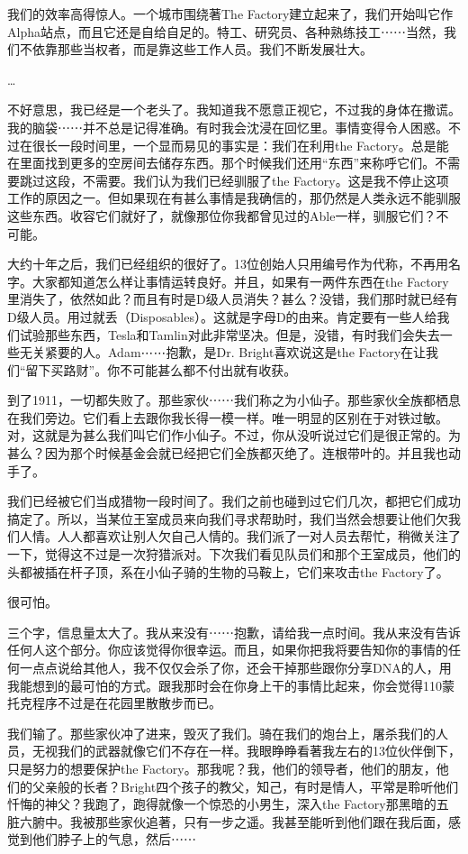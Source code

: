 我们的效率高得惊人。一个城市围绕著The Factory建立起来了，我们开始叫它作Alpha站点，而且它还是自给自足的。特工、研究员、各种熟练技工⋯⋯当然，我们不依靠那些当权者，而是靠这些工作人员。我们不断发展壮大。

…

不好意思，我已经是一个老头了。我知道我不愿意正视它，不过我的身体在撒谎。我的脑袋⋯⋯并不总是记得准确。有时我会沈浸在回忆里。事情变得令人困惑。不过在很长一段时间里，一个显而易见的事实是：我们在利用the Factory。总是能在里面找到更多的空房间去储存东西。那个时候我们还用“东西”来称呼它们。不需要跳过这段，不需要。我们认为我们已经驯服了the Factory。这是我不停止这项工作的原因之一。但如果现在有甚么事情是我确信的，那仍然是人类永远不能驯服这些东西。收容它们就好了，就像那位你我都曾见过的Able一样，驯服它们？不可能。

大约十年之后，我们已经组织的很好了。13位创始人只用编号作为代称，不再用名字。大家都知道怎么样让事情运转良好。并且，如果有一两件东西在the Factory里消失了，依然如此？而且有时是D级人员消失？甚么？没错，我们那时就已经有D级人员。用过就丢（Disposables）。这就是字母D的由来。肯定要有一些人给我们试验那些东西，Tesla和Tamlin对此非常坚决。但是，没错，有时我们会失去一些无关紧要的人。Adam⋯⋯抱歉，是Dr. Bright喜欢说这是the Factory在让我们“留下买路财”。你不可能甚么都不付出就有收获。

到了1911，一切都失败了。那些家伙⋯⋯我们称之为小仙子。那些家伙全族都栖息在我们旁边。它们看上去跟你我长得一模一样。唯一明显的区别在于对铁过敏。对，这就是为甚么我们叫它们作小仙子。不过，你从没听说过它们是很正常的。为甚么？因为那个时候基金会就已经把它们全族都灭绝了。连根带叶的。并且我也动手了。

我们已经被它们当成猎物一段时间了。我们之前也碰到过它们几次，都把它们成功搞定了。所以，当某位王室成员来向我们寻求帮助时，我们当然会想要让他们欠我们人情。人人都喜欢让别人欠自己人情的。我们派了一对人员去帮忙，稍微关注了一下，觉得这不过是一次狩猎派对。下次我们看见队员们和那个王室成员，他们的头都被插在杆子顶，系在小仙子骑的生物的马鞍上，它们来攻击the Factory了。

很可怕。

三个字，信息量太大了。我从来没有⋯⋯抱歉，请给我一点时间。我从来没有告诉任何人这个部分。你应该觉得你很幸运。而且，如果你把我将要告知你的事情的任何一点点说给其他人，我不仅仅会杀了你，还会干掉那些跟你分享DNA的人，用我能想到的最可怕的方式。跟我那时会在你身上干的事情比起来，你会觉得110蒙托克程序不过是在花园里散散步而已。

我们输了。那些家伙冲了进来，毁灭了我们。骑在我们的炮台上，屠杀我们的人员，无视我们的武器就像它们不存在一样。我眼睁睁看著我左右的13位伙伴倒下，只是努力的想要保护the Factory。那我呢？我，他们的领导者，他们的朋友，他们的父亲般的长者？Bright四个孩子的教父，知己，有时是情人，平常是聆听他们忏悔的神父？我跑了，跑得就像一个惊恐的小男生，深入the Factory那黑暗的五脏六腑中。我被那些家伙追著，只有一步之遥。我甚至能听到他们跟在我后面，感觉到他们脖子上的气息，然后⋯⋯

